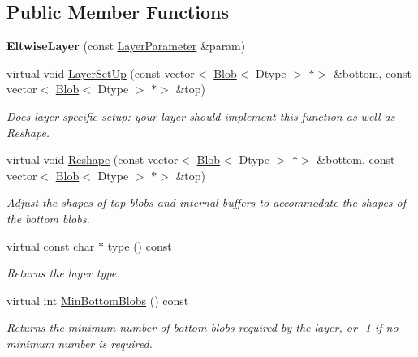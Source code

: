 \subsection*{Public Member Functions}
\begin{DoxyCompactItemize}
\item 
\mbox{\label{classcaffe_1_1_eltwise_layer_a896ae6914a6358a90e3e67621a6fe082}} 
{\bfseries Eltwise\+Layer} (const \mbox{\hyperlink{classcaffe_1_1_layer_parameter}{Layer\+Parameter}} \&param)
\item 
virtual void \mbox{\hyperlink{classcaffe_1_1_eltwise_layer_a02516b6e7b1b0d032e586785687bcabc}{Layer\+Set\+Up}} (const vector$<$ \mbox{\hyperlink{classcaffe_1_1_blob}{Blob}}$<$ Dtype $>$ $\ast$$>$ \&bottom, const vector$<$ \mbox{\hyperlink{classcaffe_1_1_blob}{Blob}}$<$ Dtype $>$ $\ast$$>$ \&top)
\begin{DoxyCompactList}\small\item\em Does layer-\/specific setup\+: your layer should implement this function as well as Reshape. \end{DoxyCompactList}\item 
virtual void \mbox{\hyperlink{classcaffe_1_1_eltwise_layer_a17b4cb0842a154224bab9733e77e07b9}{Reshape}} (const vector$<$ \mbox{\hyperlink{classcaffe_1_1_blob}{Blob}}$<$ Dtype $>$ $\ast$$>$ \&bottom, const vector$<$ \mbox{\hyperlink{classcaffe_1_1_blob}{Blob}}$<$ Dtype $>$ $\ast$$>$ \&top)
\begin{DoxyCompactList}\small\item\em Adjust the shapes of top blobs and internal buffers to accommodate the shapes of the bottom blobs. \end{DoxyCompactList}\item 
\mbox{\label{classcaffe_1_1_eltwise_layer_a2942edf636e0a740d718781325912693}} 
virtual const char $\ast$ \mbox{\hyperlink{classcaffe_1_1_eltwise_layer_a2942edf636e0a740d718781325912693}{type}} () const
\begin{DoxyCompactList}\small\item\em Returns the layer type. \end{DoxyCompactList}\item 
virtual int \mbox{\hyperlink{classcaffe_1_1_eltwise_layer_a802079d89e0f007c15b39e0c1fb0d275}{Min\+Bottom\+Blobs}} () const
\begin{DoxyCompactList}\small\item\em Returns the minimum number of bottom blobs required by the layer, or -\/1 if no minimum number is required. \end{DoxyCompactList}\item 

\end{DoxyCompactItemize}
